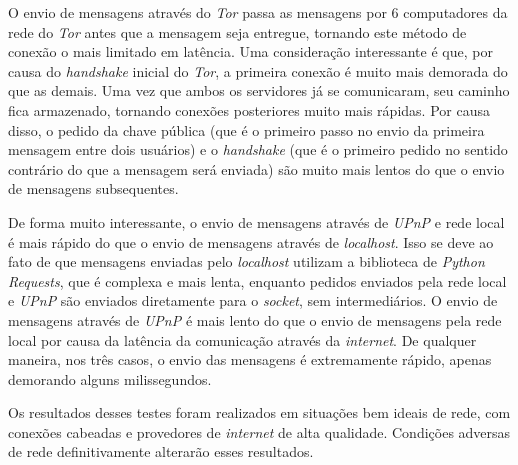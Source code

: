 O envio de mensagens através do \textit{Tor} passa as mensagens por 6 computadores da rede do \textit{Tor} antes que a mensagem seja entregue, tornando este método de conexão o mais limitado em latência. Uma consideração interessante é que, por causa do \textit{handshake} inicial do \textit{Tor}, a primeira conexão é muito mais demorada do que as demais. Uma vez que ambos os servidores já se comunicaram, seu caminho fica armazenado, tornando conexões posteriores muito mais rápidas. Por causa disso, o pedido da chave pública (que é o primeiro passo no envio da primeira mensagem entre dois usuários) e o \textit{handshake} (que é o primeiro pedido no sentido contrário do que a mensagem será enviada) são muito mais lentos do que o envio de mensagens subsequentes.

De forma muito interessante, o envio de mensagens através de \textit{UPnP} e rede local é mais rápido do que o envio de mensagens através de \textit{localhost}. Isso se deve ao fato de que mensagens enviadas pelo \textit{localhost} utilizam a biblioteca de \textit{Python Requests}, que é complexa e mais lenta, enquanto pedidos enviados pela rede local e \textit{UPnP} são enviados diretamente para o \textit{socket}, sem intermediários. O envio de mensagens através de \textit{UPnP} é mais lento do que o envio de mensagens pela rede local por causa da latência da comunicação através da \textit{internet}. De qualquer maneira, nos três casos, o envio das mensagens é extremamente rápido, apenas demorando alguns milissegundos.

Os resultados desses testes foram realizados em situações bem ideais de rede, com conexões cabeadas e provedores de \textit{internet} de alta qualidade. Condições adversas de rede definitivamente alterarão esses resultados.